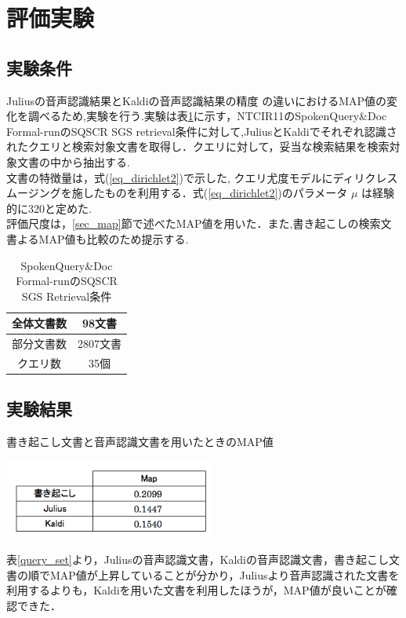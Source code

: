 \section{評価実験}
\subsection{実験条件}
Juliusの音声認識結果とKaldiの音声認識結果の精度
の違いにおけるMAP値の変化を調べるため,実験を行う.実験は表\ref{t_condition}に示す，NTCIR11のSpokenQuery\&Doc Formal-runのSQSCR SGS retrieval条件に対して,JuliusとKaldiでそれぞれ認識されたクエリと検索対象文書を取得し．クエリに対して，妥当な検索結果を検索対象文書の中から抽出する. \\文書の特徴量は，式(\ref{eq_dirichlet2})で示した, クエリ尤度モデルにディリクレスムージングを施したものを利用する．式(\ref{eq_dirichlet2})のパラメータ $\mu$ は経験的に320と定めた. \\ 
評価尺度は，\ref{sec_map}節で述べたMAP値を用いた．また,書き起こしの検索文書よるMAP値も比較のため提示する.

\begin{table}[htbp]
    \begin{center}
        \caption{SpokenQuery\&Doc Formal-runのSQSCR SGS Retrieval条件}
        \begin{tabular}{|c|c|}
            \hline
            全体文書数 & 98文書 \\ \hline
            部分文書数 & 2807文書 \\ \hline
            クエリ数 & 35個 \\ \hline
        \end{tabular}
        \label{t_condition}
    \end{center}
\end{table}

\subsection{実験結果}

\begin{table}[htbp]
    \centering
    \caption{書き起こし文書と音声認識文書を用いたときのMAP値}
    \includegraphics[width=7cm]{./image/write_julius_kaldi.png}
    \label{query_set}
\end{table}

表\ref{query_set}より，Juliusの音声認識文書，Kaldiの音声認識文書，書き起こし文書の順でMAP値が上昇していることが分かり，Juliusより音声認識された文書を利用するよりも，Kaldiを用いた文書を利用したほうが，MAP値が良いことが確認できた．



